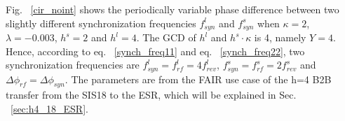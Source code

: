 Fig. ~\ref{cir_noint} shows the periodically variable phase difference between two slightly different synchronization frequencies $f_{\mathit{syn}}^{l}$ and $f_{\mathit{syn}}^{s}$ when $\kappa=2$, $\lambda=-0.003$, $h^s=2$ and $h^l=4$. The GCD of $h^l$ and $h^s \cdot \kappa$ is 4, namely $Y=4$. Hence, according to eq. ~\ref{synch_freq11} and eq. ~\ref{synch_freq22}, two synchronization frequencies are $f_{\mathit{syn}}^{l}=f_{\mathit{rf}}^{l}=4f_{\mathit{rev}}^{l}$, $f_{\mathit{syn}}^{s}=f_{\mathit{rf}}^{s}=2f_{\mathit{rev}}^{s}$ and $\Delta \phi_\mathit{rf}=\Delta \phi_\mathit{syn}$.  The parameters are from the FAIR use case of the h=4 B2B transfer from the SIS18 to the ESR, which will be explained in Sec. ~\ref{sec:h4_18_ESR}. 

 

%

